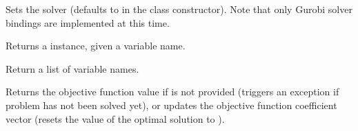 \documentclass[letterpaper,10pt,english]{sphinxmanual}
\begin{document}
\begin{fulllineitems}
\begin{fulllineitems}
\end{fulllineitems}


\begin{fulllineitems}
\label{\detokenize{opt:opt.Problem.solver}}
Sets the solver (defaults to  in the class constructor). Note that only Gurobi solver bindings are implemented at this time.

\end{fulllineitems}


\begin{fulllineitems}
\label{\detokenize{opt:opt.Problem.var}}
Returns a  instance, given a variable name.

\end{fulllineitems}


\begin{fulllineitems}
\label{\detokenize{opt:opt.Problem.var_names}}
Return a list of variable names.

\end{fulllineitems}


\begin{fulllineitems}
\label{\detokenize{opt:opt.Problem.z}}
Returns the objective function value if  is not provided (triggers an exception if problem has not been solved yet), or updates the objective function coefficient vector (resets the value of the optimal solution to ).

\end{fulllineitems}


\end{fulllineitems}

\end{document}
